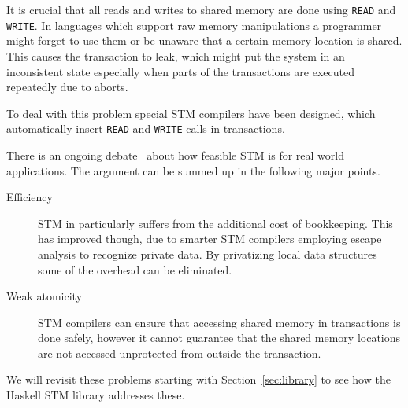 It is crucial that all reads and writes to shared memory are done using
\texttt{READ} and \texttt{WRITE}. In languages which support raw memory
manipulations a programmer might forget to use them or be unaware that a certain
memory location is shared. This causes the transaction to leak, which might put
the system in an inconsistent state especially when parts of the transactions
are executed repeatedly due to aborts.

To deal with this problem special STM compilers have been designed, which
automatically insert \texttt{READ} and \texttt{WRITE} calls in transactions.

There is an ongoing debate~\cite{research-toy,not-research-toy} about how
feasible STM is for real world applications. The argument can be summed up in
the following major points.

\begin{description}
\item[Efficiency] STM in particularly suffers from the additional cost of
  bookkeeping. This has improved though, due to smarter STM compilers employing
  escape analysis to recognize private data. By privatizing local data
  structures some of the overhead can be eliminated.
\item[Weak atomicity] STM compilers can ensure that accessing shared memory in
  transactions is done safely, however it cannot guarantee that the shared
  memory locations are not accessed unprotected from outside the transaction.
\end{description}

We will revisit these problems starting with Section~\ref{sec:library} to
see how the Haskell STM library addresses these.